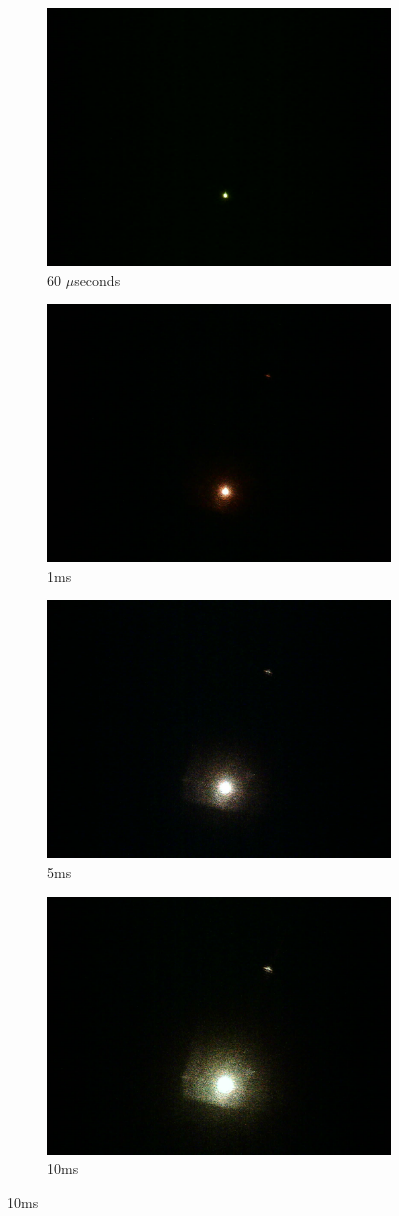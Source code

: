     \begin{figure}[ht]
    \centering
    \begin{subfigure}{0.5\textwidth}
    \centering
        \includegraphics[width=0.5\linewidth]{pics/exposure/60us}
        \caption{60 $\mu$seconds}
        \label{fig:exp60us}
    \end{subfigure}%
    \begin{subfigure}{0.5\textwidth}
    \centering
        \includegraphics[width=0.5\linewidth]{pics/exposure/1ms}
        \caption{1ms}
        \label{fig:exp1ms}
    \end{subfigure}
    
    \begin{subfigure}{0.5\textwidth}
    \centering
        \includegraphics[width=0.5\linewidth]{pics/exposure/5ms}
        \caption{5ms}
        \label{fig:exp5ms}
    \end{subfigure}%
    \begin{subfigure}{0.5\textwidth}
    \centering
        \includegraphics[width=0.5\linewidth]{pics/exposure/10ms}
        \caption{10ms}
        \label{fig:exp10ms}
    \end{subfigure}
        

\end{figure}
